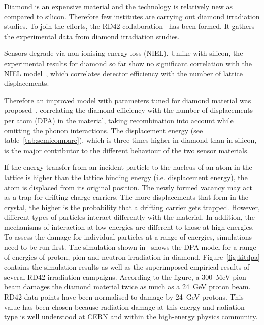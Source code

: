 Diamond is an expensive material and the technology is relatively new as compared to silicon. Therefore few institutes are carrying out diamond irradiation studies. To join the efforts, the RD42 collaboration~\cite{RD42:00000} has been formed. It gathers the experimental data from diamond irradiation studies. 

Sensors degrade via non-ionising energy loss (NIEL). Unlike with silicon, the experimental results for diamond so far show no significant correlation with the NIEL model~\cite{2002NIMPA}, which correlates detector efficiency with the number of lattice displacements.  

Therefore an improved model with parameters tuned for diamond material was proposed~\cite{Guthoff:2014223}, correlating the diamond efficiency with the number of displacements per atom (DPA) in the material, taking recombination into account while omitting the phonon interactions. The displacement energy (see table~\ref{tab:semicompare}), which is three times higher in diamond than in silicon, is the major contributor to the different behaviour of the two sensor materials.

If the energy transfer from an incident particle to the nucleus of an atom in the lattice is higher than the lattice binding energy (i.e. displacement energy), the atom is displaced from its original position. The newly formed vacancy may act as a trap for drifting charge carriers. The more displacements that form in the crystal, the higher is the probability that a drifting carrier gets trapped. However, different types of particles interact differently with the material. In addition, the mechanisms of interaction at low energies are different to those at high energies. To assess the damage for individual particles at a range of energies, simulations need to be run first. The simulation shown in~\cite{Guthoff:2014223} shows the DPA model for a range of energies of proton, pion and neutron irradiation in diamond. Figure~\ref{fig:kitdpa}  contains the simulation results as well as the superimposed empirical results of several RD42 irradiation campaigns. According to the figure, a 300~MeV pion beam damages the diamond material twice as much as a 24~GeV proton beam. RD42 data points have been normalised to damage by 24~GeV protons. This value has been chosen because radiation damage at this energy and radiation type is well understood at CERN and within the high-energy physics community.

